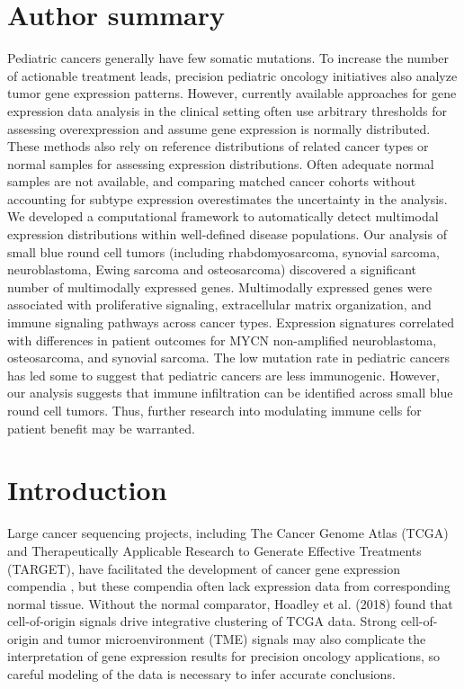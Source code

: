 \documentclass[10pt,letterpaper]{article}
\begin{document}
\section*{Author summary}
Pediatric cancers generally have few somatic mutations. To increase the number of actionable treatment leads, precision pediatric oncology initiatives also analyze tumor gene expression patterns. However, currently available approaches for gene expression data analysis in the clinical setting often use arbitrary thresholds for assessing overexpression and assume gene expression is normally distributed. These methods also rely on reference distributions of related cancer types or normal samples for assessing expression distributions. Often adequate normal samples are not available, and comparing matched cancer cohorts without accounting for subtype expression overestimates the uncertainty in the analysis. We developed a computational framework to automatically detect multimodal expression distributions within well-defined disease populations. Our analysis of small blue round cell tumors (including rhabdomyosarcoma, synovial sarcoma, neuroblastoma, Ewing sarcoma and osteosarcoma) discovered a significant number of multimodally expressed genes. Multimodally expressed genes were associated with proliferative signaling, extracellular matrix organization, and immune signaling pathways across cancer types. Expression signatures correlated with differences in patient outcomes for MYCN non-amplified neuroblastoma, osteosarcoma, and synovial sarcoma. The low mutation rate in pediatric cancers has led some to suggest that pediatric cancers are less immunogenic. However, our analysis suggests that immune infiltration can be identified across small blue round cell tumors. Thus, further research into modulating immune cells for patient benefit may be warranted.

\linenumbers

\section*{Introduction}
Large cancer sequencing projects, including The Cancer Genome Atlas (TCGA) and Therapeutically Applicable Research to Generate Effective Treatments (TARGET), have facilitated the development of cancer gene expression compendia \cite{vivianToilEnablesReproducible2017, pughGeneticLandscapeHighrisk2013, goldmanUCSCXenaPlatform2018, thecancergenomeatlasresearchnetworkCancerGenomeAtlas2013, newtonTumorMapExploringMolecular2017, vaskeComparativeTumorRNA2019}, but these compendia often lack expression data from corresponding normal tissue. Without the normal comparator, Hoadley et al. (2018) found that cell-of-origin signals drive integrative clustering of TCGA data. Strong cell-of-origin and tumor microenvironment (TME) signals may also complicate the interpretation of gene expression results for precision oncology applications, so careful modeling of the data is necessary to infer accurate conclusions.
\end{document}

